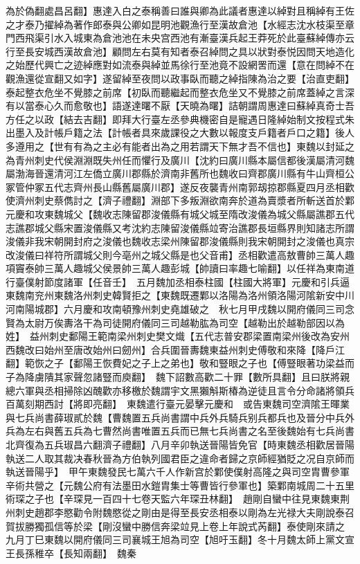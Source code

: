 為於偽翻處昌呂翻】惠達入白之泰稱善曰誰與卿為此議者惠達以綽對且稱綽有王佐之才泰乃擢綽為著作郎泰與公卿如昆明池觀漁行至漢故倉池【水經志沈水枝渠至章門西飛渠引水入城東為倉池池在未央宫西池有漸臺漢兵起王莽死於此臺蘇綽傳亦云行至長安城西漢故倉池】顧問左右莫有知者泰召綽問之具以狀對泰悦因問天地造化之始歷代興亡之迹綽應對如流泰與綽並馬徐行至池竟不設網罟而還【意在問綽不在觀漁還從宣翻又如字】遂留綽至夜問以政事臥而聽之綽指陳為治之要【治直吏翻】泰起整衣危坐不覺膝之前席【初臥而聽繼起而整衣危坐又不覺膝之前席蓋綽之言深有以當泰心久而愈敬也】語遂達曙不厭【天曉為曙】詰朝謂周惠達曰蘇綽真奇士吾方任之以政【結去吉翻】即拜大行臺左丞參典機密自是寵遇日隆綽始制文按程式朱出墨入及計帳戶籍之法【計帳者具來歲課役之大數以報度支戶籍者戶口之籍】後人多遵用之【世有有為之主必有能者出為之用若謂天下無才吾不信也】東魏以封延之為青州刺史代侯淵淵既失州任而懼行及廣川【沈約曰廣川縣本屬信都後漢屬清河魏屬渤海晉還清河江左僑立廣川郡縣於濟南非舊所也魏收曰齊郡廣川縣有牛山齊桓公冢管仲冢五代志齊州長山縣舊屬廣川郡】遂反夜襲青州南郭刼掠郡縣夏四月丞相歡使濟州刺史蔡儁討之【濟子禮翻】淵部下多叛淵欲南奔於道為賣漿者所斬送首於鄴　元慶和攻東魏城父【魏收志陳留郡浚儀縣有城父城至隋改浚儀為城父縣屬譙郡五代志譙郡城父縣宋置浚儀縣又考沈約志陳留浚儀縣竝寄治譙郡長垣縣界則知諸志所謂浚儀非我宋朝開封府之浚儀也魏收志梁州陳留郡浚儀縣則我宋朝開封之浚儀也真宗改浚儀曰祥符所謂城父則今亳州之城父縣是也父音甫】丞相歡遣高敖曹帥三萬人趣項竇泰帥三萬人趣城父侯景帥三萬人趣彭城【帥讀曰率趣七喻翻】以任祥為東南道行臺僕射節度諸軍【任音壬】　五月魏加丞相泰柱國【柱國大將軍】元慶和引兵逼東魏南兖州東魏洛州刺史韓賢拒之【東魏既遷鄴以洛陽為洛州領洛陽河隂新安中川河南陽城郡】六月慶和攻南頓豫州刺史堯雄破之　秋七月甲戌魏以開府儀同三司念賢為太尉万俟夀洛干為司徒開府儀同三司越勒肱為司空【越勒出於越勒部因以為姓】　益州刺史鄱陽王範南梁州刺史樊文熾【五代志普安郡梁置南梁州後改為安州西魏改曰始州至唐改始州曰劒州】合兵圍晉夀魏東益州刺史傅敬和來降【降戶江翻】範恢之子【鄱陽王恢費妃之子上之弟也】敬和豎眼之子也【傅豎眼著功梁益而子為降虜隤其家聲忽諸豎而庾翻】　魏下詔數高歡二十罪【數所具翻】且曰朕將親總六軍與丞相掃除凶醜歡亦移檄於魏謂宇文黑獺斛斯椿為逆徒且言令分命諸將領兵百萬刻期西討【將即亮翻】　東魏遣行臺元晏擊元慶和　或告東魏司空濟隂王暉業與七兵尚書薛琡貳於魏【曹魏置五兵尚書謂中兵外兵騎兵别兵都兵也及晉分中兵外兵為左右與舊五兵為七曹然尚書唯置五兵而已無七兵尚書之名至後魏始有七兵尚書北齊復為五兵琡昌六翻濟子禮翻】八月辛卯執送晉陽皆免官【時東魏丞相歡居晉陽執送二人取其裁决春秋晉為方伯執列國君臣之違命者歸之京師經猶貶之况自京師而執送晉陽乎】　甲午東魏發民七萬六千人作新宫於鄴使僕射高隆之與司空胄曹參軍辛術共營之【元魏公府有法墨田水鎧胄集士等曹皆行參軍也】築鄴南城周二十五里術琛之子也【辛琛見一百四十七卷天監六年琛丑林翻】　趙剛自蠻中往見東魏東荆州刺史趙郡李愍勸令附魏愍從之剛由是得至長安丞相泰以剛為左光禄大夫剛說泰召賀拔勝獨孤信等於梁【剛沒蠻中勝信奔梁竝見上卷上年說式芮翻】泰使剛來請之　九月丁巳東魏以開府儀同三司襄城王旭為司空【旭吁玉翻】冬十月魏太師上黨文宣王長孫稚卒【長知兩翻】　魏秦

